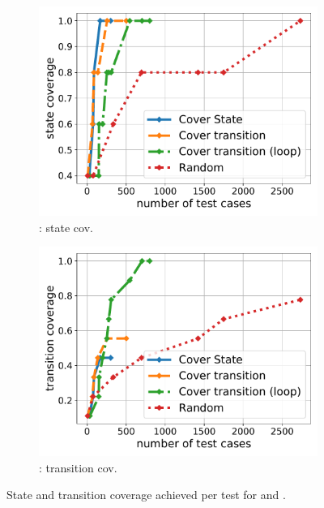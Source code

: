\begin{figure}[t]
\begin{subfigure}[b]{0.47\columnwidth}
		\includegraphics[width=\columnwidth]{Figures/Chapter3/BlindAuction-state-coverage.pdf}
		\caption{: state cov.}
		\label{fig:auction-state}
	\end{subfigure}
	\begin{subfigure}[b]{0.47\columnwidth}
		\includegraphics[width=\columnwidth]{Figures/Chapter3/BlindAuction-transition-coverage.pdf}
		\caption{: transition cov.}
		\label{fig:auction-transition}
	\end{subfigure}
	\caption{State and transition coverage achieved per test for \wecredit and
		.}\label{fig:coverage}
\end{figure}

